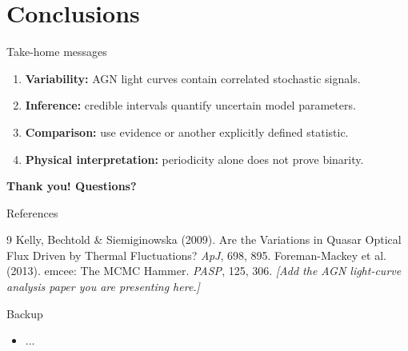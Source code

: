 \documentclass[aspectratio=169,11pt]{beamer}
\begin{document}
\section{Conclusions}
\begin{frame}{Take-home messages}
  \begin{enumerate}
    \setlength{\itemsep}{0.9em}
    \item \textbf{Variability:} AGN light curves contain correlated stochastic signals.
    \item \textbf{Inference:} credible intervals quantify uncertain model parameters.
    \item \textbf{Comparison:} use evidence or another explicitly defined statistic.
    \item \textbf{Physical interpretation:} periodicity alone does not prove binarity.
  \end{enumerate}
  \vfill
  {\large\bfseries\color{AstroCyan}Thank you! \qquad Questions?}
\end{frame}

\begin{frame}{References}
  \footnotesize
  \begin{thebibliography}{9}
      Kelly, Bechtold \& Siemiginowska (2009).
      \newblock Are the Variations in Quasar Optical Flux Driven by Thermal Fluctuations?
      \newblock \emph{ApJ}, 698, 895.
      Foreman-Mackey et al. (2013).
      \newblock emcee: The MCMC Hammer.
      \newblock \emph{PASP}, 125, 306.
      \emph{[Add the AGN light-curve analysis paper you are presenting here.]}
  \end{thebibliography}
\end{frame}

\appendix
\begin{frame}{Backup}
  \begin{itemize}
    \item ...
  \end{itemize}
\end{frame}
\end{document}
